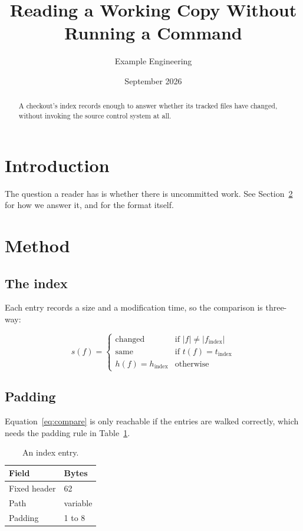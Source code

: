 \documentclass[11pt,a4paper,twoside]{article}
\title{Reading a Working Copy Without Running a Command}
\author{Example Engineering}
\date{September 2026}
\begin{document}
\maketitle

\begin{abstract}
A checkout's index records enough to answer whether its tracked files have
changed, without invoking the source control system at all.
\end{abstract}

\section{Introduction}
\label{sec:intro}

The question a reader has is whether there is uncommitted work. See
Section~\ref{sec:method} for how we answer it, and \cite{torvalds2005} for
the format itself.

\section{Method}
\label{sec:method}

\subsection{The index}
\label{sec:index}

Each entry records a size and a modification time, so the comparison is
three-way:

\begin{equation}
\label{eq:compare}
s(f) =
\begin{cases}
  \text{changed} & \text{if } \lvert f \rvert \neq \lvert f_{\text{index}} \rvert \\
  \text{same}    & \text{if } t(f) = t_{\text{index}} \\
  h(f) = h_{\text{index}} & \text{otherwise}
\end{cases}
\end{equation}

\subsection{Padding}

Equation~\ref{eq:compare} is only reachable if the entries are walked
correctly, which needs the padding rule in Table~\ref{tab:padding}.

\begin{table}
\centering
\begin{tabular}{ll}
\toprule
Field & Bytes \\
\midrule
Fixed header & 62 \\
Path & variable \\
Padding & 1 to 8 \\
\bottomrule
\end{tabular}
\caption{An index entry.}
\label{tab:padding}
\end{table}
\end{document}
